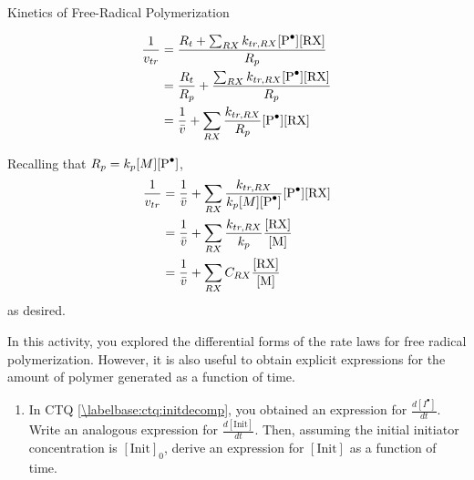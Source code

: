 \begin{activity}{Kinetics of Free-Radical Polymerization}
\begin{exercises}
\begin{enumerate}
				\begin{solution}{}
					\begin{align*}
						\frac{1}{v_{tr}} &= \frac{R_t + \sum_{RX} k_{tr,RX}[\text{\ce{P^.}}][\text{RX}]}{R_p}\\
							&= \frac{R_t}{R_p} + \frac{\sum_{RX} k_{tr,RX}[\text{\ce{P^.}}][\text{RX}]}{R_p}\\
							&= \frac{1}{\bar v} + \sum_{RX} \frac{k_{tr,RX}}{R_p}[\text{\ce{P^.}}][\text{RX}]
					\end{align*}
				\end{solution}	%
				\begin{solution}{}
				Recalling that $R_p = k_p [M][\text{\ce{P^.}}]$,
					\begin{align*}
						\frac{1}{v_{tr}} &= \frac{1}{\bar v} + \sum_{RX} \frac{k_{tr,RX}}{k_p [M][\text{\ce{P^.}}]}[\text{\ce{P^.}}][\text{RX}]\\
							&= \frac{1}{\bar v} + \sum_{RX} \frac{k_{tr,RX}}{k_p} \frac{[\text{RX}]}{[\text{M}]}\\
							&= \frac{1}{\bar v} + \sum_{RX} C_{RX} \frac{[\text{RX}]}{[\text{M}]}
					\end{align*}
					as desired.
				\end{solution}
				
		\end{enumerate}
		
	\exercise In this activity, you explored the differential forms of the rate laws for free radical polymerization.   However, it is also useful to obtain explicit expressions for the amount of polymer generated as a function of time.
	
		\begin{enumerate}
			\item In CTQ \ref{\labelbase:ctq:initdecomp}, you obtained an expression for $\frac{d[I^\bullet]}{dt}$.  Write an analogous expression for $\frac{d[\text{Init}]}{dt}$.  Then, assuming the initial initiator concentration is $[\text{Init}]_0$, derive an expression for $[\text{Init}]$ as a function of time.
			

\end{enumerate}
\end{exercises}
\end{activity}

